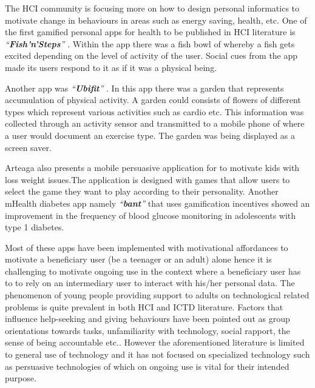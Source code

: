 \documentclass{sig-alternate}
\begin{document}
The HCI community is focusing more on  how to design personal informatics to motivate change in behaviours in areas such as energy saving, health, etc. One of the first gamified personal apps for health to be published in HCI literature is \emph{``\textbf{Fish'n'Steps}''} \cite{lin2006:fish}. Within the app there  was a fish bowl of whereby a fish gets excited depending on the level of activity of the user. Social cues from the app made its users respond to it as if it was a physical being.

Another app was \emph{``\textbf{Ubifit}''} \cite{klasnja2009:using}. In this app there was a garden that represents accumulation of physical activity. A garden could consists of flowers of different types which represent various activities such as cardio etc. This information was collected through an activity sensor and transmitted to a mobile phone of where a user would document an exercise type. The garden was being displayed as a screen saver.

Arteaga \cite{arteaga2010:persuasive} also presents a mobile persuasive application for to motivate kids with loss weight issues.The application is designed with games that allow users to select the game they want to play according to their personality. Another mHealth diabetes app namely \emph{``\textbf{bant}''} that uses gamification incentives showed an improvement in the frequency of blood glucose monitoring in adolescents with type 1 diabetes.

Most of these apps have been implemented with motivational affordances to motivate a beneficiary user (be a teenager or an adult) alone hence it is challenging to motivate ongoing use in the context where a beneficiary user has to to rely on an intermediary user to interact with his/her personal data. The phenomenon of young people providing support to adults on technological related problems is quite prevalent in both HCI and ICTD literature. Factors that influence help-seeking and giving behaviours have been pointed out as group orientations towards tasks, unfamiliarity with technology, social rapport, the sense of being accountable etc.\cite{sambasivan2010,poole:chh,kiesler:twi,parikh2006}. However the aforementioned literature is limited to general use of technology and it has not focused on specialized technology such as persuasive technologies of which on ongoing use is vital for their intended purpose.
\end{document}
